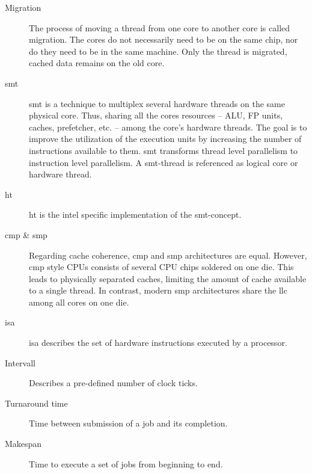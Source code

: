 \begin{description}
  \item[Migration] The process of moving a thread from one core to another core
    is called migration.
    The cores do not necessarily need to be on the same chip, nor do they need
    to be in the same machine. Only the thread is migrated, cached data remains
    on the old core.

  \item[\Gls{smt}] \gls{smt} is a technique to multiplex several hardware
    threads on the same physical core.
    Thus, sharing all the cores resources -- ALU, FP units, caches, prefetcher,
    etc. -- among the core's hardware threads.
    The goal is to improve the utilization of the execution units by increasing
    the number of instructions available to them.
    \gls{smt} transforms thread level parallelism to instruction level
    parallelism.
    A \gls{smt}-thread is referenced as logical core or hardware thread.

  \item[\Gls{ht}] \gls{ht} is the \gls{intel} specific implementation of the
    \gls{smt}-concept.

  \item[\Gls{cmp}  \& \Gls{smp}] Regarding cache coherence, \gls{cmp} and
    \gls{smp} architectures are equal.
    However, \gls{cmp} style CPUs consists of several CPU chips soldered on one
    die.
    This leads to physically separated caches, limiting the amount of cache
    available to a single thread.
    In contrast, modern \gls{smp} architectures share the \gls{llc} among all
    cores on one die.

  \item[\Gls{isa}]\gls{isa} describes the set of hardware instructions executed
    by a processor.

  \item[Intervall] Describes a pre-defined number of clock ticks.


  \item[Turnaround time] Time between submission of a job and its completion.

  \item[Makespan] Time to execute a set of jobs from beginning to end.




\end{description}
